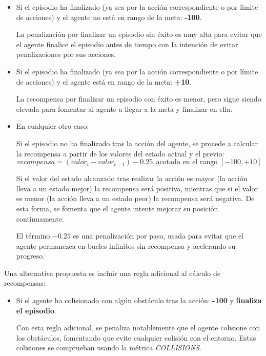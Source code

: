 \begin{itemize}

\item Si el episodio ha finalizado (ya sea por la acción correspondiente o por limite de acciones) y el agente no está en rango de la meta: \textbf{-100}.

La penalización por finalizar un episodio sin éxito es muy alta para evitar que el agente finalice el episodio antes de tiempo con la intención de evitar penalizaciones por sus acciones.

\item Si el episodio ha finalizado (ya sea por la acción correspondiente o por límite de acciones) y el agente está en rango de la meta: \textbf{+10}.

La recompensa por finalizar un episodio con éxito es menor, pero sigue siendo elevada para fomentar al agente a llegar a la meta y finalizar en ella.

\item En cualquier otro caso:

Si el episodio no ha finalizado tras la acción del agente, se procede a calcular la recompensa a partir de los valores del estado actual y el previo:
\[recompensa = (valor_t - valor_{t-1}) - 0.25, \text{acotado en el rango } [-100, +10]\]

Si el valor del estado alcanzado tras realizar la acción es mayor (la acción lleva a un estado mejor) la recompensa será positiva, mientras que si el valor es menor (la acción lleva a un estado peor) la recompensa será negativa. De esta forma, se fomenta que el agente intente mejorar su posición continuamente.

El término $-0.25$ es una penalización por paso, usada para evitar que el agente permanezca en bucles infinitos sin recompensa y acelerando su progreso.

\end{itemize} 

Una alternativa propuesta es incluir una regla adicional al cálculo de recompensas:
\begin{itemize}
	\item Si el agente ha colisionado con algún obstáculo tras la acción: \textbf{-100} y \textbf{finaliza el episodio}.
	
	Con esta regla adicional, se penaliza notablemente que el agente colisione con los obstáculos, fomentando que evite cualquier colisión con el entorno. Estas colisiones se comprueban usando la métrica \textit{COLLISIONS}.
\end{itemize}

